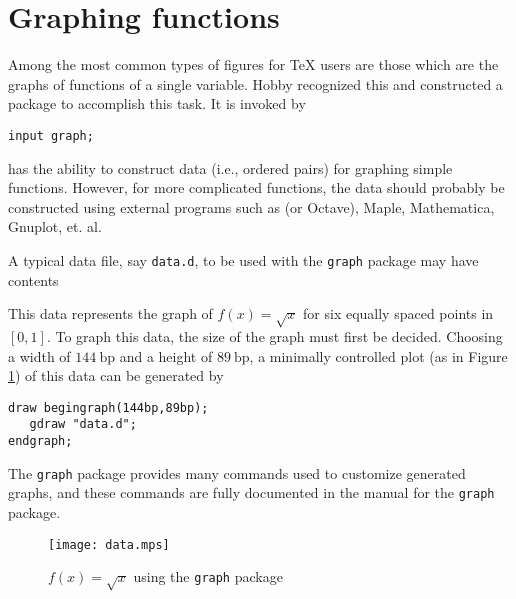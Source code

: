 \section{Graphing functions}
\label{sec:graphing}

Among the most common types of figures for \TeX{} users are those which
are the graphs of functions of a single variable.  Hobby recognized this
and constructed a package to accomplish this task.  It is invoked by

\begin{lstlisting}[xleftmargin=80bp]
input graph;
\end{lstlisting}

\MP{} has the ability to construct data (i.e., ordered pairs) for
graphing simple functions.  However, for more complicated functions, the
data should probably be constructed using external programs such as
 (or Octave), Maple, Mathematica, Gnuplot, et. al.

A typical data file, say \texttt{data.d}, to be used with
the \texttt{graph} package may have contents



This data represents the graph of $f(x)=\sqrt{x}$ for six equally spaced
points in $[0,1]$.  To graph this data, the size of the graph must first
be decided.  Choosing a width of $144\mathrm{\ bp}$ and a height of
$89\mathrm{\ bp}$, a minimally controlled plot (as in Figure
\ref{fig:data}) of this data can be generated by

\begin{lstlisting}[xleftmargin=38bp]
draw begingraph(144bp,89bp);
   gdraw "data.d";
endgraph;
\end{lstlisting}

The \texttt{graph} package provides many commands used to customize
generated graphs, and these commands are fully documented in the manual
\cite{hobby:graph} for the \texttt{graph} package.

\begin{figure}
  \centering
  \texttt{[image: data.mps]}
  \caption{$f(x)=\sqrt{x}$ using the \texttt{graph} package}
  \label{fig:data}
\end{figure}
